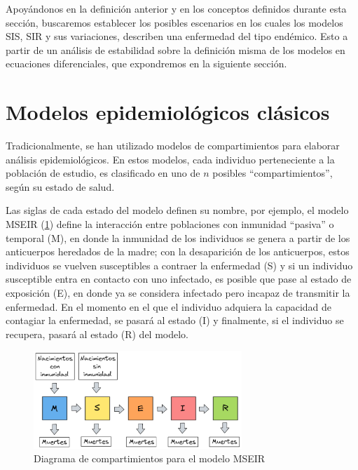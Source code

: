 Apoyándonos en la definición anterior y en los conceptos definidos durante esta sección, buscaremos establecer los posibles escenarios en los cuales los modelos SIS, SIR y sus variaciones, describen una enfermedad del tipo endémico. Esto a partir de un análisis de estabilidad sobre la definición misma de los modelos en ecuaciones diferenciales, que expondremos en la siguiente sección.

\section{Modelos epidemiológicos clásicos}\label{sec:ModelosEpidemiológicosClásicos}

Tradicionalmente, se han utilizado modelos de compartimientos para elaborar análisis epidemiológicos. En estos modelos, cada individuo perteneciente a la población de estudio, es clasificado en uno de $n$ posibles ``compartimientos'', según su estado de salud.

Las siglas de cada estado del modelo definen su nombre, por ejemplo, el modelo MSEIR (\ref{fig:MSEIR}) define la interacción entre poblaciones con inmunidad ``pasiva'' o temporal (M), en donde la inmunidad de los individuos se genera a partir de los anticuerpos heredados de la madre; con la desaparición de los anticuerpos, estos individuos se vuelven susceptibles a contraer la enfermedad (S) y si un individuo susceptible entra en contacto con uno infectado, es posible que pase al estado de exposición (E), en donde ya se considera infectado pero incapaz de transmitir la enfermedad. En el momento en el que el individuo adquiera la capacidad de contagiar la enfermedad, se pasará al estado (I) y finalmente, si el individuo se recupera, pasará al estado (R) del modelo.\cite{modelCompartimental}

\begin{figure}[h]
  \centering
    \includegraphics[width=0.7\textwidth]{Imagenes/MSEIR_compatimientos.PNG}
  \caption{Diagrama de compartimientos para el modelo MSEIR}
  \label{fig:MSEIR}
\end{figure}

